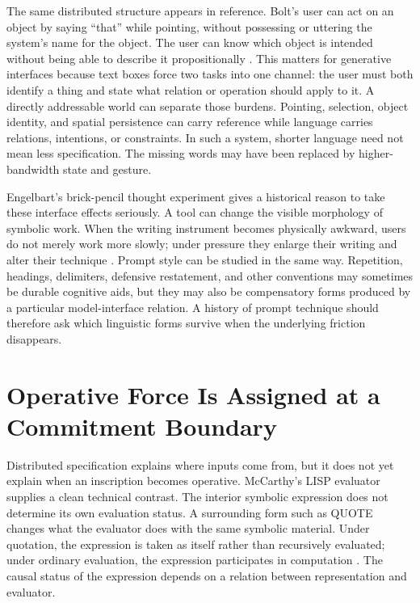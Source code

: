 \documentclass[11pt]{article}
\begin{document}
The same distributed structure appears in reference. Bolt's user can act on an object by saying ``that'' while pointing, without possessing or uttering the system's name for the object. The user can know which object is intended without being able to describe it propositionally \citep{bolt1980put}. This matters for generative interfaces because text boxes force two tasks into one channel: the user must both identify a thing and state what relation or operation should apply to it. A directly addressable world can separate those burdens. Pointing, selection, object identity, and spatial persistence can carry reference while language carries relations, intentions, or constraints. In such a system, shorter language need not mean less specification. The missing words may have been replaced by higher-bandwidth state and gesture.

Engelbart's brick-pencil thought experiment gives a historical reason to take these interface effects seriously. A tool can change the visible morphology of symbolic work. When the writing instrument becomes physically awkward, users do not merely work more slowly; under pressure they enlarge their writing and alter their technique \citep{engelbart1962augmenting}. Prompt style can be studied in the same way. Repetition, headings, delimiters, defensive restatement, and other conventions may sometimes be durable cognitive aids, but they may also be compensatory forms produced by a particular model-interface relation. A history of prompt technique should therefore ask which linguistic forms survive when the underlying friction disappears.

\section{Operative Force Is Assigned at a Commitment Boundary}

Distributed specification explains where inputs come from, but it does not yet explain when an inscription becomes operative. McCarthy's LISP evaluator supplies a clean technical contrast. The interior symbolic expression does not determine its own evaluation status. A surrounding form such as QUOTE changes what the evaluator does with the same symbolic material. Under quotation, the expression is taken as itself rather than recursively evaluated; under ordinary evaluation, the expression participates in computation \citep{mccarthy1960recursive}. The causal status of the expression depends on a relation between representation and evaluator.
\end{document}
